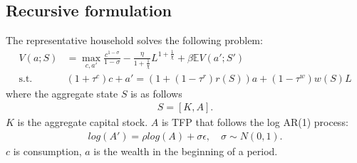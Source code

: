 \subsection*{Recursive formulation}
The representative household solves the following problem:
\begin{align*}
  V(a;S) &= \max_{c,a'} \frac{c^{1-\sigma}}{1-\sigma} - 
  \frac{\eta}{1+\frac{1}{\chi}}L^{1+\frac{1}{\chi}}+ \beta \mathbb{E}V(a';S')
  \\
  \text{s.t. }& 
  (1+\tau^{c})c+a' = (1+(1-\tau^{r})r(S))a + (1-\tau^{w})w(S)L
\end{align*}
where the aggregate state $S$ is as follows
\begin{align*}
  S = [K,A].
\end{align*}
$K$ is the aggregate capital stock. $A$ is TFP that follows the log AR(1) process:
\begin{align*}
  log(A') = \rho log(A) + \sigma\epsilon,\quad\sigma\sim N(0,1).
\end{align*}
$c$ is consumption, $a$ is the wealth in the beginning of a period. 

